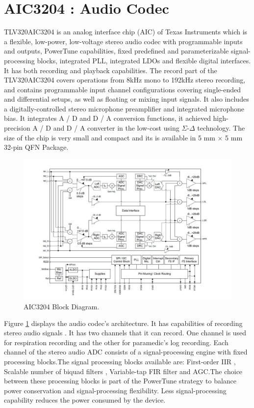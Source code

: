 \section{AIC3204 : Audio Codec}
TLV320AIC3204 is an analog interface chip (AIC) of Texas Instruments which is a flexible, low-power, low-voltage stereo audio codec with programmable inputs and outputs, PowerTune capabilities, fixed predefined and parameterizable signal-processing blocks, integrated PLL, integrated LDOs and flexible digital interfaces.  It has both recording and playback capabilities. The record part of the TLV320AIC3204 covers operations from 8kHz mono to 192kHz stereo recording, and contains programmable input channel configurations covering single-ended and differential setups, as well as floating or mixing input signals. It also includes a digitally-controlled stereo microphone preamplifier and integrated microphone bias. It integrates A / D and D / A conversion functions, it achieved high-precision A / D and D / A converter in the low-cost using $\Sigma$-$\Delta$ technology. The size of the chip is very small and compact and its is available in  5 mm × 5 mm 32-pin QFN Package. 

\begin{figure}[h]
	\centering
	\includegraphics[scale = 0.7 ]{AIC3204.JPG}
	\caption{AIC3204 Block Diagram. \cite{audiocodec}\label{aic3204}}
\end{figure}

Figure \ref{aic3204} displays the audio codec's architecture. It has capabilities of recording stereo audio signals . It has two channels that it can record. One channel is used for respiration recording and the other for paramedic's log recording.
Each
channel of the stereo audio ADC consists of a signal-processing engine with fixed processing blocks.The signal processing blocks available are:
First-order IIR
, Scalable number of biquad filters
, Variable-tap FIR filter
and AGC.The choice between these processing blocks is part of the PowerTune strategy to balance power
conservation and signal-processing flexibility. Less signal-processing capability reduces the power
consumed by the device.
